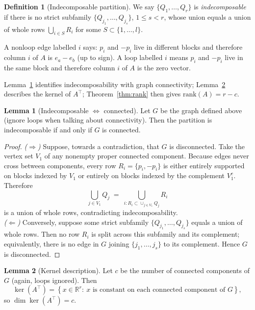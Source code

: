 \documentclass[11pt]{article}
\numberwithin{equation}{section}
\theoremstyle{plain}
\theoremstyle{definition}
\theoremstyle{definition}
\newtheorem{definition}{Definition}
\theoremstyle{assumption}
\theoremstyle{proposition}
\theoremstyle{proposition}
\theoremstyle{example}
\theoremstyle{lemma}
\newtheorem{lemma}{Lemma}[section]
\theoremstyle{theorem}
\theoremstyle{remark}
\begin{document}
\begin{definition}[Indecomposable partition]
We say $\{Q_1,\dots,Q_r\}$ is \emph{indecomposable} if there is no strict subfamily $\{Q_{j_1},\dots,Q_{j_s}\}$, $1\le s<r$, whose union equals a union of whole rows $\bigcup_{i\in S} R_i$ for some $S\subset\{1,\dots,l\}$. 
\end{definition}

\noindent A nonloop edge labelled $i$ says: $p_i$ and $-p_i$ live in different blocks and therefore column $i$ of $A$ is $e_a-e_b$ (up to sign).
A loop labelled $i$ means $p_i$ and $-p_i$ live in the same block and therefore column $i$ of $A$ is the zero vector.


Lemma~\ref{lem:indec-connected} identifies indecomposability with graph connectivity; Lemma~\ref{lem:kernel} describes the kernel of \(A^\top\); Theorem~\ref{thm:rank} then gives \(\mathrm{rank}(A)=r-c\).

\begin{lemma}[Indecomposable $\iff$ connected]\label{lem:indec-connected}
Let $G$ be the graph defined above (ignore loops when talking about connectivity). Then the partition is indecomposable if and only if $G$ is connected.
\end{lemma}

\begin{proof}
\emph{($\Rightarrow$)} Suppose, towards a contradiction, that $G$ is disconnected. Take the vertex set $V_1$ of any nonempty proper connected component. Because edges never cross between components, every row $R_i=\{p_i,-p_i\}$ is either entirely supported on blocks indexed by $V_1$ or entirely on blocks indexed by the complement $V_1^c$. Therefore
\[
\bigcup_{j\in V_1} Q_j \;=\; \bigcup_{i: R_i\subset \cup_{j\in V_1}Q_j} R_i
\]
is a union of whole rows, contradicting indecomposability.\\


\emph{($\Leftarrow$)} Conversely, suppose some strict subfamily $\{Q_{j_1},\dots,Q_{j_s}\}$ equals a union of whole rows. Then no row $R_i$ is split across this subfamily and its complement; equivalently, there is no edge in $G$ joining $\{j_1,\dots,j_s\}$ to its complement. Hence $G$ is disconnected.
\end{proof}

\begin{lemma}[Kernel description]\label{lem:kernel}
Let $c$ be the number of connected components of $G$ (again, loops ignored). Then
\[
\ker(A^\top)=\left\{x\in\mathbb{R}^r:\ x \text{ is constant on each connected component of }G\right\},
\]
so $\dim\ker(A^\top)=c$.
\end{lemma}
\end{document}
